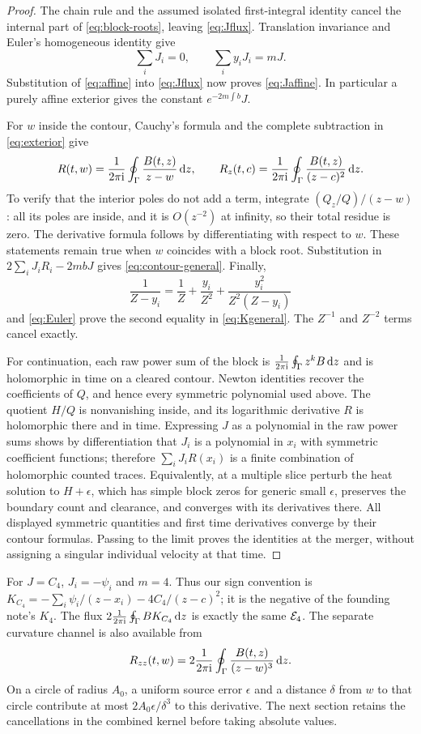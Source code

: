 \begin{proof}
The chain rule and the assumed isolated first-integral identity
cancel the internal part of \eqref{eq:block-roots}, leaving
\eqref{eq:Jflux}. Translation invariance and Euler's homogeneous
identity give
\begin{equation}
 \sum_iJ_i=0,\qquad \sum_i y_iJ_i=mJ.
 \label{eq:Euler}
\end{equation}
Substitution of \eqref{eq:affine} into \eqref{eq:Jflux} now proves
\eqref{eq:Jaffine}. In particular a purely affine exterior gives
the constant $e^{-2m\int b}J$.

For $w$ inside the contour, Cauchy's formula and the complete
subtraction in \eqref{eq:exterior} give
\begin{equation}
 R(t,w)=\frac{1}{2\pi\mathrm i}\oint_\Gamma \frac{B(t,z)}{z-w}\,\mathrm d z,\qquad
 R_z(t,c)=\frac{1}{2\pi\mathrm i}\oint_\Gamma \frac{B(t,z)}{(z-c)^2}\,\mathrm d z.
 \label{eq:exterior-Cauchy}
\end{equation}
To verify that the interior poles do not add a term, integrate
$(Q_z/Q)/(z-w)$: all its poles are inside, and it is $O(z^{-2})$
at infinity, so their total residue is zero. The derivative
formula follows by differentiating with respect to $w$. These
statements remain true when $w$ coincides with a block root.
Substitution in $2\sum_iJ_iR_i-2mbJ$ gives
\eqref{eq:contour-general}. Finally,
\[
 \frac1{Z-y_i}=\frac1Z+\frac{y_i}{Z^2}
                   +\frac{y_i^2}{Z^2(Z-y_i)}
\]
and \eqref{eq:Euler} prove the second equality in
\eqref{eq:Kgeneral}. The $Z^{-1}$ and $Z^{-2}$ terms cancel exactly.

For continuation, each raw power sum of the block is
$\frac{1}{2\pi\mathrm i}\oint_\Gamma z^kB\,\mathrm d z$ and is holomorphic in time on a cleared contour.
Newton identities recover the coefficients of $Q$, and hence every
symmetric polynomial used above. The quotient $H/Q$ is nonvanishing
inside, and its logarithmic derivative $R$ is holomorphic there
and in time. Expressing $J$ as a polynomial in the raw power sums
shows by differentiation that $J_i$ is a polynomial in $x_i$ with
symmetric coefficient functions;
therefore $\sum_iJ_iR(x_i)$ is a finite combination of holomorphic
counted traces. Equivalently, at a multiple slice perturb the heat
solution to $H+\epsilon$, which has simple block zeros for generic
small $\epsilon$, preserves the boundary count and clearance, and
converges with its derivatives there. All displayed symmetric
quantities and first time derivatives converge by their contour
formulas. Passing to the limit proves the identities at the merger,
without assigning a singular individual velocity at that time.
\end{proof}

For $J=C_4$, $J_i=-\psi_i$ and $m=4$. Thus our sign convention
is $K_{C_4}=-\sum_i\psi_i/(z-x_i)-4C_4/(z-c)^2$; it is the
negative of the founding note's $K_4$. The flux
$2\frac{1}{2\pi\mathrm i}\oint_\Gamma BK_{C_4}\,\mathrm d z$ is exactly the same $\mathcal E_4$.
The separate curvature channel is also available from
\begin{equation}
 R_{zz}(t,w)=2\frac{1}{2\pi\mathrm i}\oint_\Gamma \frac{B(t,z)}{(z-w)^3}\,\mathrm d z.
 \label{eq:Rzz}
\end{equation}
On a circle of radius $A_0$, a uniform source error $\epsilon$
and a distance $\delta$ from $w$ to that circle contribute at most
$2A_0\epsilon/\delta^3$ to this derivative. The next section
retains the cancellations in the combined kernel before taking
absolute values.
